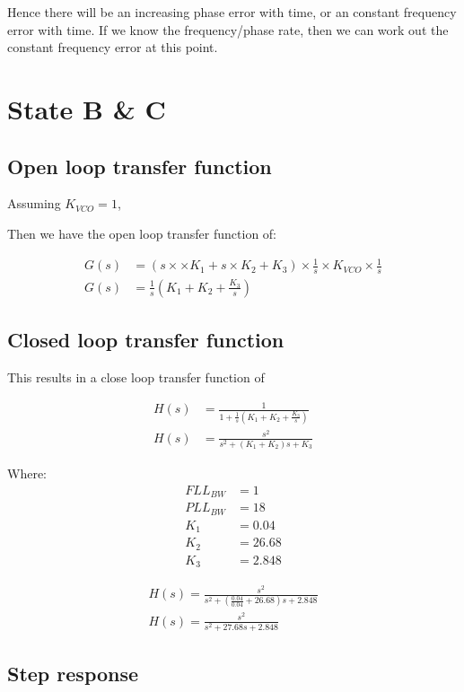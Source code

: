 Hence there will be an increasing phase error with time, or an constant frequency error with time. If we know the frequency/phase rate, then we can work out the constant frequency error at this point.

\clearpage

\section{State B \& C}


\subsection{Open loop transfer function}

Assuming $K_{VCO} = 1$, 

Then we have the open loop transfer function of: 

\begin{align}
G(s) &= (s \times \times K_1 + s \times K_2 + K_3 ) \times \frac{1}{s} \times K_{VCO} \times \frac{1}{s}\\
G(s) &= \frac{1}{s} (K_1 + K_2 +  \frac{K_3}{s})
\end{align}

 
\subsection{Closed loop transfer function}
This results in a close loop transfer function of 

\begin{align}
H(s) &= \frac{1}{1+\frac{1}{s} (K_1 + K_2 +  \frac{K_3}{s})}\\
H(s) &= \frac{s^2}{s^2 + (K_1 + K_2)s + K_3}
\end{align}

Where:
\begin{align*}
FLL_{BW} &=1\\
PLL_{BW} &=18\\
K_1 &=  0.04\\
K_2 &= 26.68\\
K_3 &=  2.848
\end{align*}

\begin{align}
H(s) = \frac{s^2}{s^2 + (\frac{0.04}{0.04} +  26.68)s + 2.848}\\
H(s) = \frac{s^2}{s^2 + 27.68 s + 2.848}
\end{align}

\subsection{Step response}

